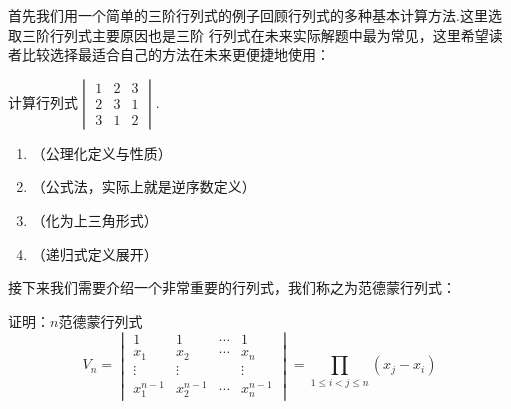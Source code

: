 首先我们用一个简单的三阶行列式的例子回顾行列式的多种基本计算方法.这里选取三阶行列式主要原因也是三阶
行列式在未来实际解题中最为常见，这里希望读者比较选择最适合自己的方法在未来更便捷地使用：
\begin{example}
    计算行列式$\begin{vmatrix}
        1 & 2 & 3 \\
        2 & 3 & 1 \\
        3 & 1 & 2
    \end{vmatrix}$.
\end{example}
\begin{solution}
\begin{enumerate}
    \item （公理化定义与性质）
    \item （公式法，实际上就是逆序数定义）
    \item （化为上三角形式）
    \item （递归式定义展开）
\end{enumerate}
\end{solution}

接下来我们需要介绍一个非常重要的行列式，我们称之为范德蒙行列式：
\begin{example}
    证明：$n$范德蒙行列式
    \[V_n=\begin{vmatrix}
        1 & 1 & \cdots & 1 \\
        x_1 & x_2 & \cdots & x_n \\
        \vdots & \vdots &  & \vdots \\
        x_1^{n-1} & x_2^{n-1} & \cdots & x_n^{n-1}
    \end{vmatrix}=\prod\limits_{1 \leqslant i < j \leqslant n}(x_j-x_i)\]
\end{example}

